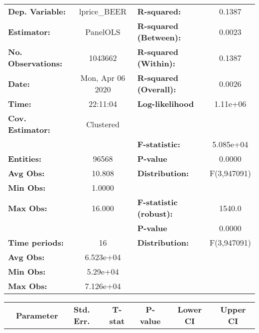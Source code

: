 \documentclass{report}
\begin{document}
\begin{center}
\begin{tabular}{lclc}
\toprule
\textbf{Dep. Variable:}    &    lprice\_BEER    & \textbf{  R-squared:         }   &      0.1387      \\
\textbf{Estimator:}        &      PanelOLS      & \textbf{  R-squared (Between):}  &      0.0023      \\
\textbf{No. Observations:} &      1043662       & \textbf{  R-squared (Within):}   &      0.1387      \\
\textbf{Date:}             &  Mon, Apr 06 2020  & \textbf{  R-squared (Overall):}  &      0.0026      \\
\textbf{Time:}             &      22:11:04      & \textbf{  Log-likelihood     }   &     1.11e+06     \\
\textbf{Cov. Estimator:}   &     Clustered      & \textbf{                     }   &                  \\
\textbf{}                  &                    & \textbf{  F-statistic:       }   &    5.085e+04     \\
\textbf{Entities:}         &       96568        & \textbf{  P-value            }   &      0.0000      \\
\textbf{Avg Obs:}          &       10.808       & \textbf{  Distribution:      }   &   F(3,947091)    \\
\textbf{Min Obs:}          &       1.0000       & \textbf{                     }   &                  \\
\textbf{Max Obs:}          &       16.000       & \textbf{  F-statistic (robust):} &      1540.0      \\
\textbf{}                  &                    & \textbf{  P-value            }   &      0.0000      \\
\textbf{Time periods:}     &         16         & \textbf{  Distribution:      }   &   F(3,947091)    \\
\textbf{Avg Obs:}          &     6.523e+04      & \textbf{                     }   &                  \\
\textbf{Min Obs:}          &      5.29e+04      & \textbf{                     }   &                  \\
\textbf{Max Obs:}          &     7.126e+04      & \textbf{                     }   &                  \\
\bottomrule
\end{tabular}
\begin{tabular}{lcccccc}
                           & \textbf{Parameter} & \textbf{Std. Err.} & \textbf{T-stat} & \textbf{P-value} & \textbf{Lower CI} & \textbf{Upper CI}  \\

\end{tabular}
\end{center}
\end{document}
